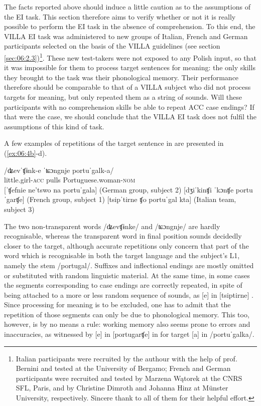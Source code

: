 The facts reported above should induce a little caution as to the assumptions of the EI task. This section therefore aims to verify whether or not it is really possible to perform the EI task in the absence of comprehension. To this end, the VILLA EI task was administered to new groups of Italian, French and German participants selected on the basis of the VILLA guidelines (see section \ref{sec:06:2.3})\footnote{Italian participants were recruited by the authour with the help of prof. Bernini and tested at the University of Bergamo; French and German participants were recruited and tested by Marzena Wątorek at the CNRS SFL, Paris, and by Christine Dimroth and Johanna Hinz at Münster University, respectively. Sincere thank to all of them for their helpful effort.}. These new test-takers were not exposed to any Polish input, so that it was impossible for them to process target sentences for meaning: the only skills they brought to the task was their phonological memory. Their performance therefore should be comparable to that of a VILLA subject who did not process targets for meaning, but only repeated them as a string of sounds. Will these participants with no comprehension skills be able to repeat ACC case endings? If that were the case, we should conclude that the VILLA EI task does not fulfil the assumptions of this kind of task.

A few examples of repetitions of the target sentence in  are presented in (\ref{ex:06:4b}-d).

\ea%
    \label{ex:06:4}
    \ea\label{ex:06:4a}
    \gll    /ʥevˈʧɨnk-e  ˈʨɔngnje  portuˈgalk-a/ \\
            little.girl-\textsc{acc}   pulls     Portuguese.woman-\textsc{nom}\\
    \ex\label{ex:06:4b}
    [ˈʧefnie ne'tswo na portuˈgala] \hfill (German group, subject 2)
    \ex\label{ex:06:4c}
    [dʒiˈkinʧi ˈkɔnʧe portuˈgarʧe] \hfill (French group, subject 1)
    \ex\label{ex:06:4d}
    [tsipˈtirne ʧo portuˈgal kta] \hfill (Italian team, subject 3)
    \z
\z

The two non-transparent words /ʥevʧɨnke/ and /ʨɔngnje/ are hardly recognisable, whereas the transparent word in final position sounds decidedly closer to the target, although accurate repetitions only concern that part of the word which is recognisable in both the target language and the subject's L1, namely the stem /portugal/. Suffixes and inflectional endings are mostly omitted or substituted with random linguistic material. At the same time, in some cases the segments corresponding to case endings are correctly repeated, in spite of being attached to a more or less random sequence of sounds, as [e] in [tsiptirne] . Since processing for meaning is to be excluded, one has to admit that the repetition of those segments can only be due to phonological memory. This too, however, is by no means a rule: working memory also seems prone to errors and inaccuracies, as witnessed by [e] in [portugarʧe] in  for target [a] in /portuˈgalka/.

